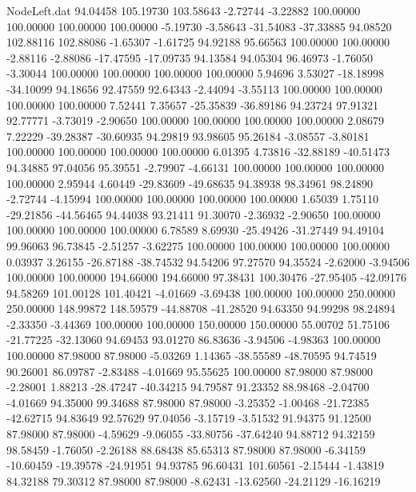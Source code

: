 \begin{filecontents}{NodeLeft.dat}
  94.04458  105.19730  103.58643    -2.72744   -3.22882  100.00000  100.00000  100.00000  100.00000   -5.19730   -3.58643  -31.54083  -37.33885
  94.08520  102.88116  102.88086    -1.65307   -1.61725   94.92188   95.66563  100.00000  100.00000   -2.88116   -2.88086  -17.47595  -17.09735
  94.13584   94.05304   96.46973    -1.76050   -3.30044  100.00000  100.00000  100.00000  100.00000    5.94696    3.53027  -18.18998  -34.10099
  94.18656   92.47559   92.64343    -2.44094   -3.55113  100.00000  100.00000  100.00000  100.00000    7.52441    7.35657  -25.35839  -36.89186
  94.23724   97.91321   92.77771    -3.73019   -2.90650  100.00000  100.00000  100.00000  100.00000    2.08679    7.22229  -39.28387  -30.60935
  94.29819   93.98605   95.26184    -3.08557   -3.80181  100.00000  100.00000  100.00000  100.00000    6.01395    4.73816  -32.88189  -40.51473
  94.34885   97.04056   95.39551    -2.79907   -4.66131  100.00000  100.00000  100.00000  100.00000    2.95944    4.60449  -29.83609  -49.68635
  94.38938   98.34961   98.24890    -2.72744   -4.15994  100.00000  100.00000  100.00000  100.00000    1.65039    1.75110  -29.21856  -44.56465
  94.44038   93.21411   91.30070    -2.36932   -2.90650  100.00000  100.00000  100.00000  100.00000    6.78589    8.69930  -25.49426  -31.27449
  94.49104   99.96063   96.73845    -2.51257   -3.62275  100.00000  100.00000  100.00000  100.00000    0.03937    3.26155  -26.87188  -38.74532
  94.54206   97.27570   94.35524    -2.62000   -3.94506  100.00000  100.00000  194.66000  194.66000   97.38431  100.30476  -27.95405  -42.09176
  94.58269  101.00128  101.40421    -4.01669   -3.69438  100.00000  100.00000  250.00000  250.00000  148.99872  148.59579  -44.88708  -41.28520
  94.63350   94.99298   98.24894    -2.33350   -3.44369  100.00000  100.00000  150.00000  150.00000   55.00702   51.75106  -21.77225  -32.13060
  94.69453   93.01270   86.83636    -3.94506   -4.98363  100.00000  100.00000   87.98000   87.98000   -5.03269    1.14365  -38.55589  -48.70595
  94.74519   90.26001   86.09787    -2.83488   -4.01669   95.55625  100.00000   87.98000   87.98000   -2.28001    1.88213  -28.47247  -40.34215
  94.79587   91.23352   88.98468    -2.04700   -4.01669   94.35000   99.34688   87.98000   87.98000   -3.25352   -1.00468  -21.72385  -42.62715
  94.83649   92.57629   97.04056    -3.15719   -3.51532   91.94375   91.12500   87.98000   87.98000   -4.59629   -9.06055  -33.80756  -37.64240
  94.88712   94.32159   98.58459    -1.76050   -2.26188   88.68438   85.65313   87.98000   87.98000   -6.34159  -10.60459  -19.39578  -24.91951
  94.93785   96.60431  101.60561    -2.15444   -1.43819   84.32188   79.30312   87.98000   87.98000   -8.62431  -13.62560  -24.21129  -16.16219

\end{filecontents}

